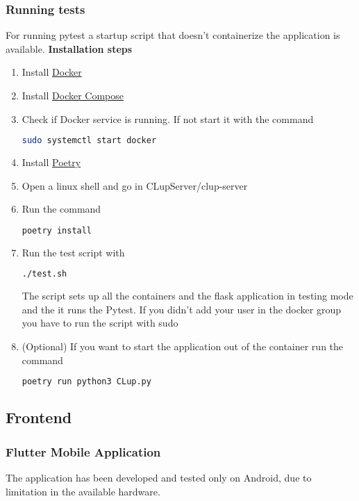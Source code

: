 \subsubsection{Running tests}
For running pytest a startup script that doesn't containerize the application is available.
\textbf{Installation steps}
\begin{enumerate}
    \item Install \href{https://docs.docker.com/get-docker/}{Docker}
    \item Install \href{https://docs.docker.com/compose/install/}{Docker Compose}
    \item Check if Docker service is running. If not start it with the command
          \begin{lstlisting}[language=bash]
    sudo systemctl start docker
    \end{lstlisting}
    \item Install \href{https://python-poetry.org/}{Poetry}
    \item Open a linux shell and go in CLupServer/clup-server
    \item Run the command
          \begin{lstlisting}[language=bash]
    poetry install
    \end{lstlisting}
    \item Run the test script with
          \begin{lstlisting}[language=bash]
    ./test.sh
    \end{lstlisting}
          The script sets up all the containers and the flask application in testing mode and the it runs the Pytest.
          If you didn't add your user in the docker group
          you have to run the script with sudo
    \item (Optional) If you want to start the application out of the container run the command
          \begin{lstlisting}[language=bash]
    poetry run python3 CLup.py
    \end{lstlisting}
\end{enumerate}

\subsection{Frontend}

\subsubsection{Flutter Mobile Application}
The application has been developed and tested only on Android, due to limitation in the available hardware.

